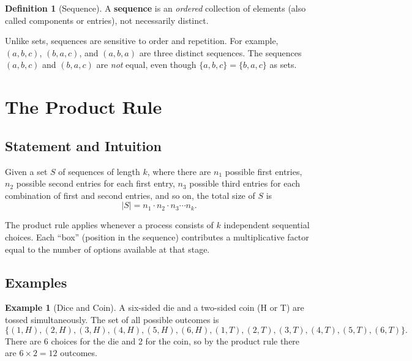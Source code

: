 \documentclass[11pt, a4paper, notitlepage]{report}
\theoremstyle{definition}
\newtheorem{definition}[theorem]{Definition}
\newtheorem{example}[theorem]{Example}
\theoremstyle{remark}
\begin{document}
\begin{definition}[Sequence]
\label{def:sequence}
A \textbf{sequence} is an \emph{ordered} collection of elements (also called
components or entries), not necessarily distinct.
\end{definition}

Unlike sets, sequences are sensitive to order and repetition. For example, $(a, b, c)$,
$(b, a, c)$, and $(a, b, a)$ are three distinct sequences. The sequences $(a, b, c)$ and
$(b, a, c)$ are \emph{not} equal, even though $\{a, b, c\} = \{b, a, c\}$ as sets.

\section{The Product Rule}

\subsection{Statement and Intuition}

\begin{keyresult}[title={Key Result: Product Rule}]
Given a set $S$ of sequences of length $k$, where there are $n_1$ possible first entries,
$n_2$ possible second entries for each first entry, $n_3$ possible third entries for each
combination of first and second entries, and so on, the total size of $S$ is
\[
  |S| = n_1 \cdot n_2 \cdot n_3 \cdots n_k.
\]
\end{keyresult}

The product rule applies whenever a process consists of $k$ independent sequential choices.
Each ``box'' (position in the sequence) contributes a multiplicative factor equal to the number
of options available at that stage.

\subsection{Examples}

\begin{example}[Dice and Coin]
A six-sided die and a two-sided coin (H or T) are tossed simultaneously. The set of all
possible outcomes is
\[
  \{(1,H),(2,H),(3,H),(4,H),(5,H),(6,H),(1,T),(2,T),(3,T),(4,T),(5,T),(6,T)\}.
\]
There are 6 choices for the die and 2 for the coin, so by the product rule there are
$6 \times 2 = 12$ outcomes.
\end{example}
\end{document}
